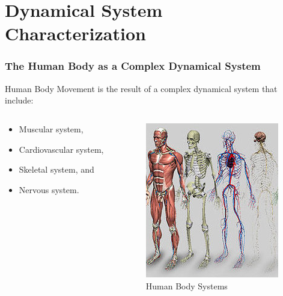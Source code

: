 \documentclass{beamer}
\theoremstyle{definition}
\begin{document}
\section{Dynamical System Characterization}



\begin{frame}
\frametitle{The Human Body as a Complex Dynamical System}
Human Body Movement is the result of a complex dynamical system
 that include:  
\begin{columns}[onlytextwidth]
\begin{column}{0.5\textwidth}
\begin{itemize}
 \item Muscular system,
 \item Cardiovascular system,
 \item Skeletal system, and
 \item Nervous system.
\end{itemize}
\end{column} 
\begin{column}{0.5\textwidth}
\begin{figure}
\includegraphics[scale=0.4]{humanbodysystems}
\centering 
\caption{Human Body Systems}
\end{figure}
    \end{column}
\end{columns}

\end{frame}
\end{document}
